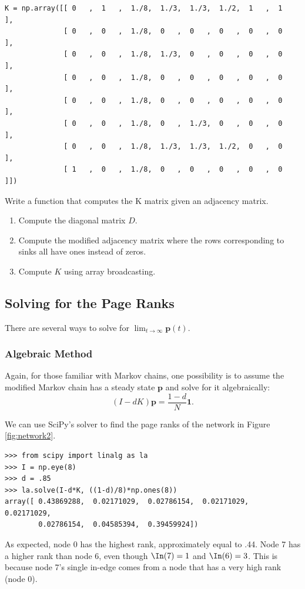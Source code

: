 \begin{lstlisting}
K = np.array([[ 0   ,  1   ,  1./8,  1./3,  1./3,  1./2,  1   ,  1   ],
              [ 0   ,  0   ,  1./8,  0   ,  0   ,  0   ,  0   ,  0   ],
              [ 0   ,  0   ,  1./8,  1./3,  0   ,  0   ,  0   ,  0   ],
              [ 0   ,  0   ,  1./8,  0   ,  0   ,  0   ,  0   ,  0   ],
              [ 0   ,  0   ,  1./8,  0   ,  0   ,  0   ,  0   ,  0   ],
              [ 0   ,  0   ,  1./8,  0   ,  1./3,  0   ,  0   ,  0   ],
              [ 0   ,  0   ,  1./8,  1./3,  1./3,  1./2,  0   ,  0   ],
              [ 1   ,  0   ,  1./8,  0   ,  0   ,  0   ,  0   ,  0   ]])
\end{lstlisting}
\begin{problem}
Write a function that computes the K matrix given an adjacency matrix.
\begin{enumerate}
\item Compute the diagonal matrix $D$.
\item Compute the modified adjacency matrix where the rows corresponding to sinks all have ones instead of zeros.
\item Compute $K$ using array broadcasting.
\end{enumerate}
\end{problem}


\subsection*{Solving for the Page Ranks}
There are several ways to solve for $\lim_{t \to \infty} \mathbf{p}(t)$.
\subsubsection*{Algebraic Method}
Again, for those familiar with Markov chains, one possibility is to assume the modified Markov chain has a steady state $\mathbf{p}$ and solve for it algebraically:
\begin{equation}\label{equ:matrix_solve}
(I-dK)\mathbf{p} = \frac{1-d}{N} \mathbf{1}.
\end{equation}

We can use SciPy's solver to find the page ranks of the network in Figure \ref{fig:network2}.
\begin{lstlisting}
>>> from scipy import linalg as la
>>> I = np.eye(8)
>>> d = .85
>>> la.solve(I-d*K, ((1-d)/8)*np.ones(8))
array([ 0.43869288,  0.02171029,  0.02786154,  0.02171029,  0.02171029,
        0.02786154,  0.04585394,  0.39459924])
\end{lstlisting}
As expected, node 0 has the highest rank, approximately equal to .44.
Node 7 has a higher rank than node 6, even though $\In(7)=1$ and $\In(6)=3$.
This is because node 7's single in-edge comes from a node that has a very high rank (node 0).

